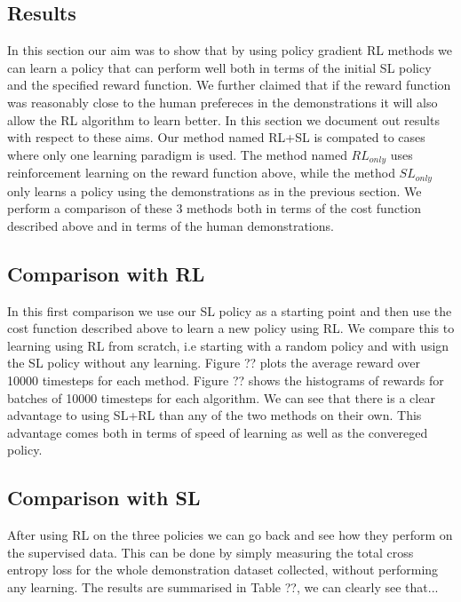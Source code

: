 \documentclass[a4paper,11pt]{report}
\begin{document}
\subsection{Results}
In this section our aim was to show that by using policy gradient RL methods we can learn a policy that can perform well both in terms of the initial SL policy and the specified reward function. We further claimed that if the reward function was reasonably close to the human prefereces in the demonstrations it will also allow the RL algorithm to learn better. In this section we document out results with respect to these aims. Our method named RL+SL is compated to cases where only one learning paradigm is used. The method named $RL_{only}$ uses reinforcement learning on the reward function above, while the method $SL_{only}$ only learns a policy using the demonstrations as in the previous section. We perform a comparison of these 3 methods both in terms of the cost function described above and in terms of the human demonstrations.

\subsection{Comparison with RL}
In this first comparison we use our SL policy as a starting point and then use the cost function described above to learn a new policy using RL. We compare this to learning using RL from scratch, i.e starting with a random policy and with usign the SL policy without any learning. Figure ?? plots the average reward over 10000 timesteps for each method. Figure ?? shows the histograms of rewards for batches of 10000 timesteps for each algorithm. We can see that there is a clear advantage to using SL+RL than any of the two methods on their own. This advantage comes both in terms of speed of learning as well as the convereged policy.

\subsection{Comparison with SL}
After using RL on the three policies we can go back and see how they perform on the supervised data. This can be done by simply measuring the total cross entropy loss for the whole demonstration dataset collected, without performing any learning. The results are summarised in Table ??, we can clearly see that...  
\end{document}
